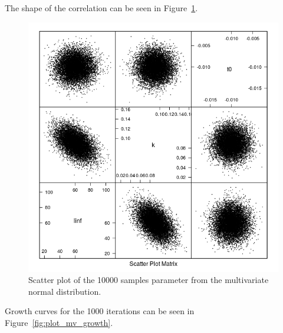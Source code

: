 \documentclass[a4paper,english,10pt]{article}\usepackage[]{graphicx}\usepackage[]{color}
\newenvironment{knitrout}{}{} %
\begin{document}
The shape of the correlation can be seen in Figure~\ref{fig:plot_norm_scatter}.
\begin{knitrout}
\color{fgcolor}\begin{figure}[H]

{\centering \includegraphics[width=.9\linewidth]{figure/plot_norm_scatter-1} 

}

\caption[Scatter plot of the 10000 samples parameter from the multivariate normal distribution]{Scatter plot of the 10000 samples parameter from the multivariate normal distribution.}\label{fig:plot_norm_scatter}
\end{figure}


\end{knitrout}

Growth curves for the 1000 iterations can be seen in Figure~\ref{fig:plot_mv_growth}.
\end{document}
